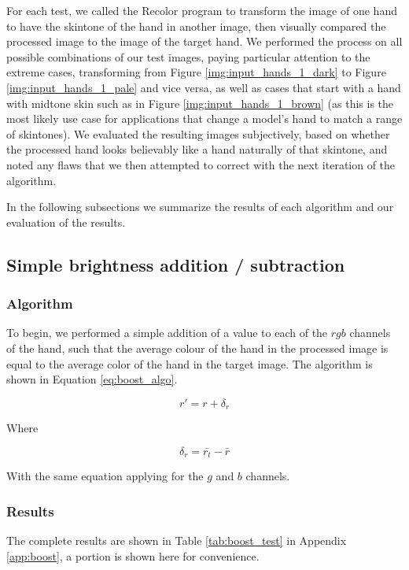 \documentclass[12pt, a4paper]{article}
\newcommand*\mean[1]{\bar{#1}}
\begin{document}
 For each test, we called the Recolor program to transform the image of one hand to have the skintone of the hand in another image, then visually compared the processed image to the image of the target hand. We performed the process on all possible combinations of our test images, paying particular attention to the extreme cases, transforming from Figure \ref{img:input_hands_1_dark} to Figure \ref{img:input_hands_1_pale} and vice versa, as well as cases that start with a hand with midtone skin such as in Figure \ref{img:input_hands_1_brown} (as this is the most likely use case for applications that change a model's hand to match a range of skintones). We evaluated the resulting images subjectively, based on whether the processed hand looks believably like a hand naturally of that skintone, and noted any flaws that we then attempted to correct with the next iteration of the algorithm.

In the following subsections we summarize the results of each algorithm and our evaluation of the results.

\subsection{Simple brightness addition / subtraction}
\subsubsection{Algorithm}
To begin, we performed a simple addition of a value to each of the $rgb$ channels of the hand, such that the average colour of the hand in the processed image is equal to the average color of the hand in the target image. The algorithm is shown in Equation \ref{eq:boost_algo}.

\begin{equation} \label{eq:boost_algo}
r' = r + \delta_r
\end{equation}

Where 

\begin{equation*}
\delta_r = \mean{r_t} - \mean{r}
\end{equation*}

With the same equation applying for the $g$ and $b$ channels.

\subsubsection{Results}
The complete results are shown in Table \ref{tab:boost_test} in Appendix \ref{app:boost}, a portion is shown here for convenience.
\end{document}
